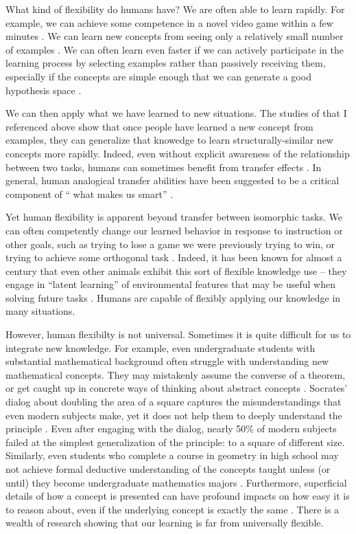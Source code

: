 \documentclass[11pt]{article}
\begin{document}
What kind of flexibility do humans have? We are often able to learn rapidly. For example, we can achieve some competence in a novel video game within a few minutes \citep{Lake2016}. We can learn new concepts from seeing only a relatively small number of examples \citep[e.g.]{Bourne1970}. We can often learn even faster if we can actively participate in the learning process by selecting examples rather than passively receiving them, especially if the concepts are simple enough that we can generate a good hypothesis space \citep{Markant2014a}. \par
We can then apply what we have learned to new situations. The studies of \citet{Bourne1970} that I referenced above show that once people have learned a new concept from examples, they can generalize that knowedge to learn structurally-similar new concepts more rapidly. Indeed, even without explicit awareness of the relationship between two tasks, humans can sometimes benefit from transfer effects \citep[e.g.]{Day2011}. In general, human analogical transfer abilities have been suggested to be a critical component of `` what makes us smart'' \citep{Gentner2003}. \par
Yet human flexibility is apparent beyond transfer between isomorphic tasks. We can often competently change our learned behavior in response to instruction or other goals, such as trying to lose a game we were previously trying to win, or trying to achieve some orthogonal task \citep{Lake2016}. Indeed, it has been known for almost a century that even other animals exhibit this sort of flexible knowledge use -- they engage in ``latent learning'' of environmental features that may be useful when solving future tasks \citep{Blodgett1929}. Humans are capable of flexibly applying our knowledge in many situations. \par
However, human flexibilty is not universal. Sometimes it is quite difficult for us to integrate new knowledge. For example, even undergraduate students with substantial mathematical background often struggle with understanding new mathematical concepts. They may mistakenly assume the converse of a theorem, or get caught up in concrete ways of thinking about abstract concepts \citep{Hazzan1999}. Socrates' dialog about doubling the area of a square captures the misunderstandings that even modern subjects make, yet it does not help them to deeply understand the principle \citep{Goldin2011}. Even after engaging with the dialog, nearly 50\% of modern subjects failed at the simplest generalization of the principle: to a square of different size. Similarly, even students who complete a course in geometry in high school may not achieve formal deductive understanding of the concepts taught unless (or until) they become undergraduate mathematics majors \citep{Burger1986}. Furthermore, superficial details of how a concept is presented can have profound impacts on how easy it is to reason about, even if the underlying concept is exactly the same \citep[e.g.]{Kotovsky1985, Kaminski2008, Lampinen2017b}. There is a wealth of research showing that our learning is far from universally flexible. \par 
\end{document}
